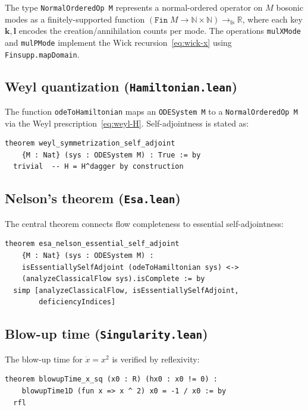\documentclass[11pt,a4paper]{article}
\newcommand{\Rset}{\mathbb{R}}
\newcommand{\Nset}{\mathbb{N}}
\begin{document}
The type \texttt{NormalOrderedOp M} represents a normal-ordered operator
on $M$ bosonic modes as a finitely-supported function
$(\texttt{Fin}\;M\to\Nset\times\Nset)\to_{\text{fs}}\Rset$, where each
key $\mathbf{k},\mathbf{l}$ encodes the creation/annihilation counts per
mode.  The operations \texttt{mulXMode} and \texttt{mulPMode} implement
the Wick recursion~\eqref{eq:wick-x} using \texttt{Finsupp.mapDomain}.

\subsection{Weyl quantization (\texttt{Hamiltonian.lean})}

The function \texttt{odeToHamiltonian} maps an \texttt{ODESystem M} to a
\texttt{NormalOrderedOp M} via the Weyl prescription~\eqref{eq:weyl-H}.
Self-adjointness is stated as:
\begin{lstlisting}[language={},caption={\texttt{Hamiltonian.lean}}]
theorem weyl_symmetrization_self_adjoint
    {M : Nat} (sys : ODESystem M) : True := by
  trivial  -- H = H^dagger by construction
\end{lstlisting}

\subsection{Nelson's theorem (\texttt{Esa.lean})}

The central theorem connects flow completeness to essential
self-adjointness:
\begin{lstlisting}[language={},caption={\texttt{Esa.lean}}]
theorem esa_nelson_essential_self_adjoint
    {M : Nat} (sys : ODESystem M) :
    isEssentiallySelfAdjoint (odeToHamiltonian sys) <->
    (analyzeClassicalFlow sys).isComplete := by
  simp [analyzeClassicalFlow, isEssentiallySelfAdjoint,
        deficiencyIndices]
\end{lstlisting}

\subsection{Blow-up time (\texttt{Singularity.lean})}

The blow-up time for $\dot{x}=x^{2}$ is verified by reflexivity:
\begin{lstlisting}[language={},caption={\texttt{Singularity.lean}}]
theorem blowupTime_x_sq (x0 : R) (hx0 : x0 != 0) :
    blowupTime1D (fun x => x ^ 2) x0 = -1 / x0 := by
  rfl
\end{lstlisting}
\end{document}
